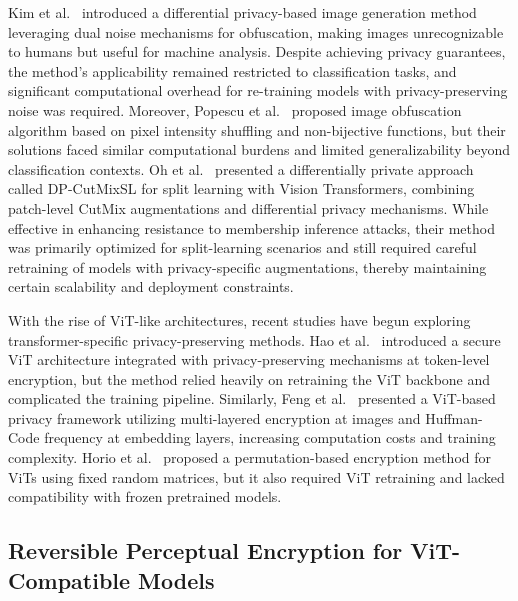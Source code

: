 \documentclass{ieeeaccess}
\newcommand{\rev}[1]{{\color{black}#1}}
\begin{document}
Kim et al.~\cite{s24103166} introduced a differential privacy-based image generation method leveraging dual noise mechanisms for obfuscation, making images unrecognizable to humans but useful for machine analysis. Despite achieving privacy guarantees, the method's applicability remained restricted to classification tasks, and significant computational overhead for re-training models with privacy-preserving noise was required. Moreover, Popescu et al.~\cite{9786187} proposed image obfuscation algorithm based on pixel intensity shuffling and non-bijective functions, but their solutions faced similar computational burdens and limited generalizability beyond classification contexts. Oh et al.~\cite{oh2022differentially} presented a differentially private approach called DP-CutMixSL for split learning with Vision Transformers, combining patch-level CutMix augmentations and differential privacy mechanisms. While effective in enhancing resistance to membership inference attacks, their method was primarily optimized for split-learning scenarios and still required careful retraining of models with privacy-specific augmentations, thereby maintaining certain scalability and deployment constraints.

With the rise of ViT-like architectures, recent studies have begun exploring transformer-specific privacy-preserving methods. Hao et al.~\cite{hao2023privacypreserving} introduced a secure ViT architecture integrated with privacy-preserving mechanisms at token-level encryption, but the method relied heavily on retraining the ViT backbone and complicated the training pipeline. Similarly, Feng et al.~\cite{10445482} presented a ViT-based privacy framework utilizing multi-layered encryption at images and Huffman-Code frequency at embedding layers, increasing computation costs and training complexity. Horio et al.~\cite{horio2024privacypreservingvisiontransformerusing} proposed a permutation-based encryption method for ViTs using fixed random matrices, but it also required ViT retraining and lacked compatibility with frozen pretrained models.

\subsection{\rev{Reversible Perceptual Encryption for ViT-Compatible Models}}
\end{document}
